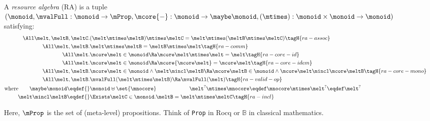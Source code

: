 \begin{defn}
  A \emph{resource algebra} (RA) is a tuple \\
  $(\monoid, \mvalFull :  \monoid \to \mProp, \mcore{{-}}:
  \monoid \to \maybe\monoid, (\mtimes) : \monoid \times \monoid \to \monoid)$ satisfying:
  \begin{align*}
    \All \melt, \meltB, \meltC.& (\melt \mtimes \meltB) \mtimes \meltC = \melt \mtimes (\meltB \mtimes \meltC) \tagH{ra-assoc} \\
    \All \melt, \meltB.& \melt \mtimes \meltB = \meltB \mtimes \melt \tagH{ra-comm} \\
    \All \melt.& \mcore\melt \in \monoid \Ra \mcore\melt \mtimes \melt = \melt \tagH{ra-core-id} \\
    \All \melt.& \mcore\melt \in \monoid \Ra \mcore{\mcore\melt} = \mcore\melt \tagH{ra-core-idem} \\
    \All \melt, \meltB.& \mcore\melt \in \monoid \land \melt \mincl \meltB \Ra \mcore\meltB \in \monoid \land \mcore\melt \mincl \mcore\meltB \tagH{ra-core-mono} \\
    \All \melt, \meltB.& \mvalFull(\melt \mtimes \meltB)  \Ra \mvalFull(\melt)  \tagH{ra-valid-op} \\
    \text{where}\qquad %
    \maybe\monoid \eqdef{}& \monoid \uplus \set{\mnocore} \qquad\qquad\qquad \melt^? \mtimes \mnocore \eqdef \mnocore \mtimes \melt^? \eqdef \melt^? \\
    \melt \mincl \meltB \eqdef{}& \Exists \meltC \in \monoid. \meltB = \melt \mtimes \meltC \tagH{ra-incl}
  \end{align*}
\end{defn}
Here, $\mProp$ is the set of (meta-level) propositions.
Think of \texttt{Prop} in Rocq or $\mathbb{B}$ in classical mathematics.

